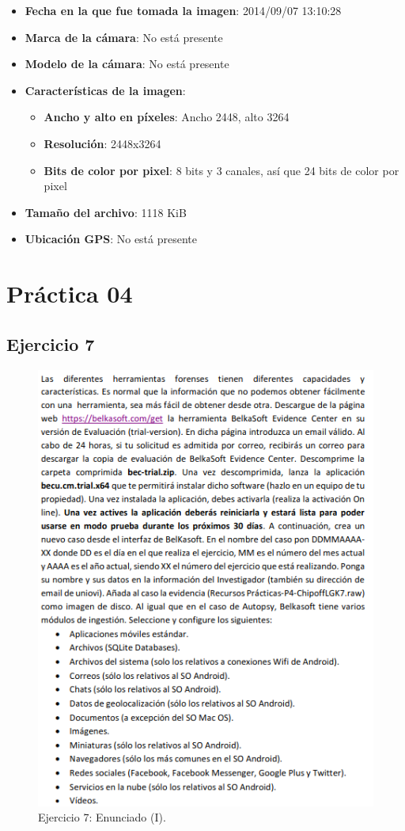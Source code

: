 \documentclass[11pt]{article}
\begin{document}
\begin{itemize}
    \item \textbf{Fecha en la que fue tomada la imagen}: 2014/09/07 13:10:28 
    \item \textbf{Marca de la cámara}: No está presente
    \item \textbf{Modelo de la cámara}: No está presente
    \item \textbf{Características de la imagen}:
        \begin{itemize}
            \item \textbf{Ancho y alto en píxeles}: Ancho 2448, alto 3264
            \item \textbf{Resolución}: 2448x3264
            \item \textbf{Bits de color por pixel}: 8 bits y 3 canales, así que 24 bits de color por pixel
        \end{itemize}
    \item \textbf{Tamaño del archivo}: 1118 KiB
    \item \textbf{Ubicación GPS}: No está presente
\end{itemize}



\section{Práctica 04}

\subsection{Ejercicio 7}

\begin{figure}[H]
    \caption{Ejercicio 7: Enunciado (I).}
  \centering
  \includegraphics[scale=0.7]{other/enunciado_p04_e7-1.png}
\end{figure}
\end{document}
